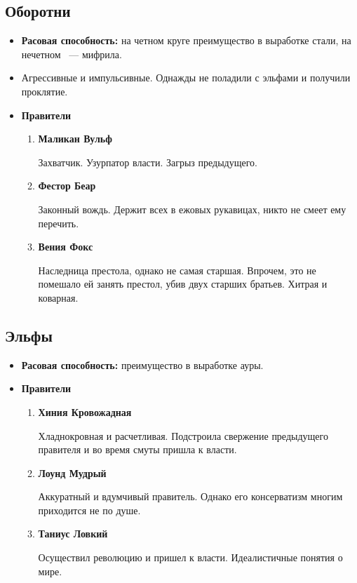 \documentclass[a4paper,12pt,landscape]{article}
\begin{document}
    \subsection{Оборотни}
    \begin{itemize}
      \item \textbf{Расовая способность:} на четном круге преимущество в выработке стали, на нечетном ~--- мифрила.
      \item Агрессивные и импульсивные. Однажды не поладили с эльфами и получили проклятие.
      \item \textbf{Правители}
        \begin{enumerate}
          \item \textbf{Маликан Вульф}
          
          Захватчик. Узурпатор власти. Загрыз предыдущего.
          \item \textbf{Фестор Беар}
          
          Законный вождь. Держит всех в ежовых рукавицах, никто не смеет ему перечить.
          
          \item \textbf{Вения Фокс}
          
          Наследница престола, однако не самая старшая. Впрочем, это не помешало ей занять престол, убив двух старших братьев. Хитрая и коварная.       
           \end{enumerate}
    \end{itemize}
    
    \subsection{Эльфы}
    \begin{itemize}
      \item \textbf{Расовая способность:} преимущество в выработке ауры.
      \item \textbf{Правители} 
        \begin{enumerate}
          \item \textbf{Хиния Кровожадная}
          
          Хладнокровная и расчетливая. Подстроила свержение предыдущего правителя и во время смуты пришла к власти.
          \item \textbf{Лоунд Мудрый}
          
          Аккуратный и вдумчивый правитель. Однако его консерватизм многим приходится не по душе.
          \item \textbf{Таниус Ловкий}
          
          Осуществил революцию и пришел к власти. Идеалистичные понятия о мире.
        \end{enumerate}
    \end{itemize}    
    
\end{document}
